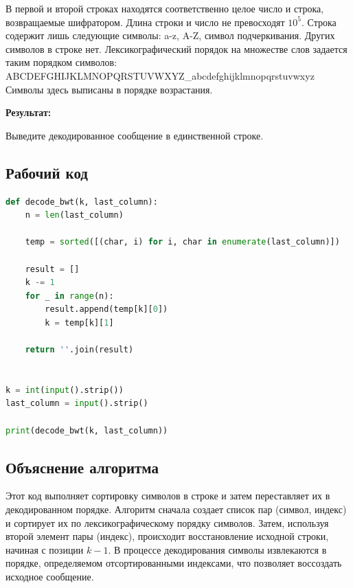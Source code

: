 \documentclass[a4paper,12pt]{article}
\begin{document}
\begin{quotebox}
    В первой и второй строках находятся соответственно целое число и строка, возвращаемые шифратором. Длина строки и число не превосходят $10^5$. Строка содержит лишь следующие символы: a-z, A-Z, символ подчеркивания. Других символов в строке нет. Лексикографический порядок на множестве слов задается таким порядком символов:
    ABCDEFGHIJKLMNOPQRSTUVWXYZ\_abcdefghijklmnopqrstuvwxyz\\[0.5em]
    Символы здесь выписаны в порядке возрастания.
\end{quotebox}
\textbf{Результат:}
\begin{quotebox}
    Выведите декодированное сообщение в единственной строке.
\end{quotebox}
\subsection*{Рабочий код}
\begin{lstlisting}[language=python]
def decode_bwt(k, last_column):
    n = len(last_column)

    temp = sorted([(char, i) for i, char in enumerate(last_column)])

    result = []
    k -= 1
    for _ in range(n):
        result.append(temp[k][0])
        k = temp[k][1]

    return ''.join(result)


k = int(input().strip())
last_column = input().strip()

print(decode_bwt(k, last_column))
\end{lstlisting}
\subsection*{Объяснение алгоритма}
Этот код выполняет сортировку символов в строке и затем переставляет их в декодированном порядке. Алгоритм сначала создает список пар (символ, индекс) и сортирует их по лексикографическому порядку символов. Затем, используя второй элемент пары (индекс), происходит восстановление исходной строки, начиная с позиции $k-1$. В процессе декодирования символы извлекаются в порядке, определяемом отсортированными индексами, что позволяет воссоздать исходное сообщение.
\newpage
\end{document}
